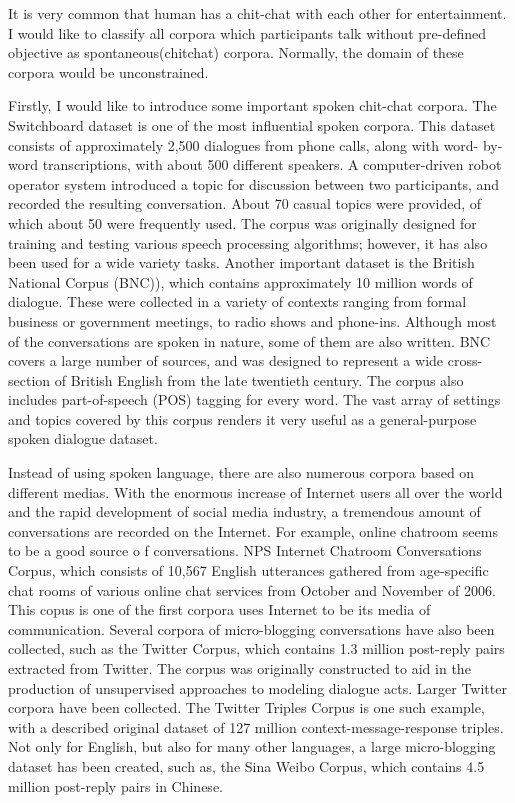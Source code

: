 \documentclass[bsc,frontabs,twoside,singlespacing,parskip,deptreport]{infthesis}     %
\begin{document}
It is very common that human has a chit-chat with each other for entertainment. I would like to classify all corpora which participants talk without pre-defined objective as spontaneous(chitchat) corpora. Normally, the domain of these corpora would be unconstrained.

Firstly, I would like to introduce some important spoken chit-chat corpora. The Switchboard dataset\cite{godfrey1992switchboard} is one of the most influential spoken corpora. This dataset consists of approximately 2,500 dialogues from phone calls, along with word- by-word transcriptions, with about 500 different speakers. A computer-driven robot operator system introduced a topic for discussion between two participants, and recorded the resulting conversation. About 70 casual topics were provided, of which about 50 were frequently used. The corpus was originally designed for training and testing various speech processing algorithms; however, it has also been used for a wide variety tasks. Another important dataset is the British National Corpus (BNC)\cite{leech1992100}), which contains approximately 10 million words of dialogue. These were collected in a variety of contexts ranging from formal business or government meetings, to radio shows and phone-ins. Although most of the conversations are spoken in nature, some of them are also written. BNC covers a large number of sources, and was designed to represent a wide cross-section of British English from the late twentieth century. The corpus also includes part-of-speech (POS) tagging for every word. The vast array of settings and topics covered by this corpus renders it very useful as a general-purpose spoken dialogue dataset.

Instead of using spoken language, there are also numerous corpora based on different medias. With the enormous increase of Internet users all over the world and the rapid development of social media industry, a tremendous amount of conversations are recorded on the Internet. For example, online chatroom seems to be a good source o f conversations. NPS Internet Chatroom Conversations Corpus\cite{forsythand2007lexical}, which consists of 10,567 English utterances gathered from age-specific chat rooms of various online chat services from October and November of 2006. This copus is one of the first corpora uses Internet to be its media of communication. Several corpora of micro-blogging conversations have also been collected, such as the Twitter Corpus\cite{ritter2010unsupervised}, which contains 1.3 million post-reply pairs extracted from Twitter. The corpus was originally constructed to aid in the production of unsupervised approaches to modeling dialogue acts. Larger Twitter corpora have been collected. The Twitter Triples Corpus\cite{sordoni2015neural} is one such example, with a described original dataset of 127 million context-message-response triples. Not only for English, but also for many other languages, a large micro-blogging dataset has been created, such as, the Sina Weibo Corpus\cite{shang2015neural}, which contains 4.5 million post-reply pairs in Chinese.
\end{document}
